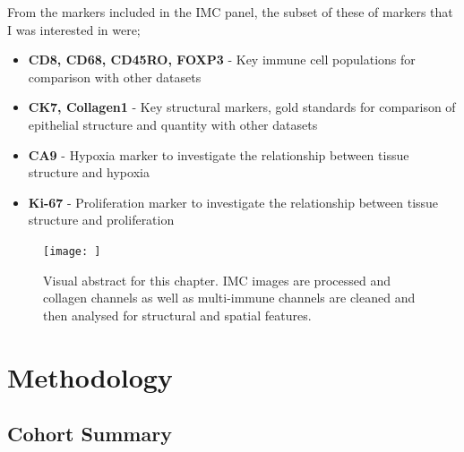 From the markers included in the IMC panel, the subset of these of markers that I was interested in were;
\begin{itemize}
\item \textbf{CD8, CD68, CD45RO, FOXP3} - Key immune cell populations for comparison with other datasets
\item \textbf{CK7, Collagen1} - Key structural markers, gold standards for comparison of epithelial structure and quantity with other datasets
\item \textbf{CA9} - Hypoxia marker to investigate the relationship between tissue structure and hypoxia
\item \textbf{Ki-67} - Proliferation marker to investigate the relationship between tissue structure and proliferation \end{itemize}

\begin{figure}
    \centering
    \texttt{[image: ]}
    \caption{Visual abstract for this chapter. IMC images are processed and collagen channels as well as multi-immune channels are cleaned and then analysed for structural and spatial features.}
    \label{fig:ch5_visualabstract}
\end{figure}

\section[Methodology]{Methodology}
\subsection{Cohort Summary}
